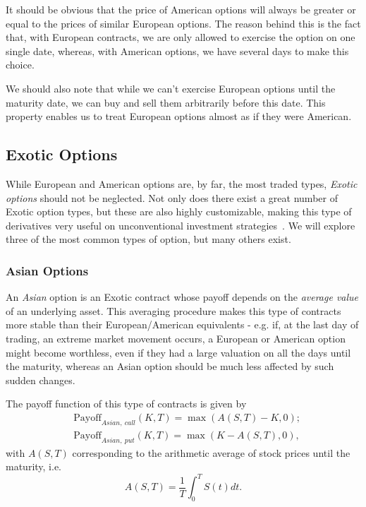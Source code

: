 It should be obvious that the price of American options will always be greater or equal to the prices of similar European options. The reason behind this is the fact that, with European contracts, we are only allowed to exercise the option on one single date, whereas, with American options, we have several days to make this choice.

We should also note that while we can't exercise European options until the maturity date, we can buy and sell them arbitrarily before this date. This property enables us to treat European options almost as if they were American.


\subsection{Exotic Options}
While European and American options are, by far, the most traded types, \emph{Exotic options} should not be neglected. Not only does there exist a great number of Exotic option types, but these are also highly customizable, making this type of derivatives very useful on unconventional investment strategies~\cite{InvExotic}. We will explore three of the most common types of option, but many others exist.

\subsubsection{Asian Options}
An \emph{Asian} option is an Exotic contract whose payoff depends on the \emph{average value} of an underlying asset. This averaging procedure makes this type of contracts more stable than their European/American equivalents - e.g. if, at the last day of trading, an extreme market movement occurs, a European or American option might become worthless, even if they had a large valuation on all the days until the maturity, whereas an Asian option should be much less affected by such sudden changes.

The payoff function of this type of contracts is given by
\begin{equation}
\begin{split}
&\text{Payoff}_{Asian,\ call}(K,T)=\max\left(A(S,T)-K,0\right);\\
&\text{Payoff}_{Asian,\ put}(K,T)=\max\left(K-A(S,T),0\right),
\end{split}
\end{equation}
\noindent with $A(S,T)$ corresponding to the arithmetic average of stock prices until the maturity, i.e.
\begin{equation}
A(S,T)=\frac{1}{T}\int_0^TS(t)dt.
\end{equation}

